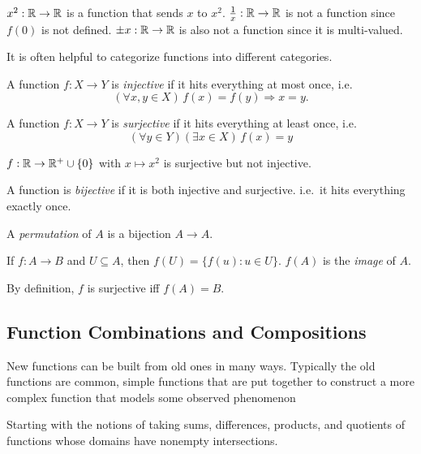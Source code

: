   \begin{eg}
    $x^2: \mathbb{R} \to \mathbb{R}$ is a function that sends $x$ to $x^2$. $\frac{1}{x}:\mathbb{R}\to\mathbb{R}$ is not a function since $f(0)$ is not defined. $\pm x: \mathbb{R}\to\mathbb{R}$ is also not a function since it is multi-valued.
  \end{eg}
  
  It is often helpful to categorize functions into different categories.
  \begin{defi}
    A function $f: X \to Y$ is \emph{injective} if it hits everything at most once, i.e.
    \[
      (\forall x, y\in X)\,f(x) = f(y)\Rightarrow x = y.
    \]
  \end{defi}
  
  \begin{defi}
    A function $f: X \to Y$ is \emph{surjective} if it hits everything at least once, i.e.
    \[
      (\forall y\in Y)(\exists x\in X)\,f(x) = y
    \]
  \end{defi}
  
  \begin{eg}
    $f: \mathbb{R} \to\mathbb{R}^+\cup\{0\}$ with $x \mapsto x^2$ is surjective but not injective.
  \end{eg}
  
  \begin{defi}
    A function is \emph{bijective} if it is both injective and surjective. i.e.\ it hits everything exactly once.
  \end{defi}
  
  \begin{defi}[Permutation]
    A \emph{permutation} of $A$ is a bijection $A\to A$.
  \end{defi}
  
  \begin{defi}
    If $f: A\to B$ and $U\subseteq A$, then $f(U) = \{f(u):u\in U\}$. $f(A)$ is
    the \emph{image} of $A$.
  \end{defi}
  By definition, $f$ is surjective iff $f(A) = B$.

\subsection{Function Combinations and Compositions}
New functions can be built from old ones in many ways. Typically the old
functions are common, simple functions that are put together to construct a more
complex function that models some observed phenomenon

Starting with the notions of taking sums, differences, products, and quotients
of functions whose domains have nonempty intersections.

